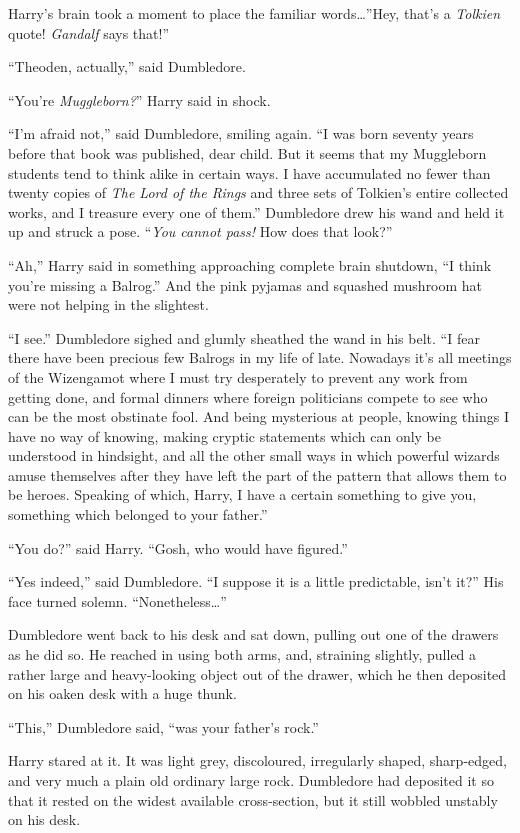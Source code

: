 Harry’s brain took a moment to place the familiar words…”Hey, that’s a \emph{Tolkien} quote! \emph{Gandalf} says that!”

“Theoden, actually,” said Dumbledore.

“You’re \emph{Muggleborn?}” Harry said in shock.

“I’m afraid not,” said Dumbledore, smiling again. “I was born seventy years before that book was published, dear child. But it seems that my Muggleborn students tend to think alike in certain ways. I have accumulated no fewer than twenty copies of \emph{The Lord of the Rings} and three sets of Tolkien’s entire collected works, and I treasure every one of them.” Dumbledore drew his wand and held it up and struck a pose. “\emph{You cannot pass!} How does that look?”

“Ah,” Harry said in something approaching complete brain shutdown, “I think you’re missing a Balrog.” And the pink pyjamas and squashed mushroom hat were not helping in the slightest.

“I see.” Dumbledore sighed and glumly sheathed the wand in his belt. “I fear there have been precious few Balrogs in my life of late. Nowadays it’s all meetings of the Wizengamot where I must try desperately to prevent any work from getting done, and formal dinners where foreign politicians compete to see who can be the most obstinate fool. And being mysterious at people, knowing things I have no way of knowing, making cryptic statements which can only be understood in hindsight, and all the other small ways in which powerful wizards amuse themselves after they have left the part of the pattern that allows them to be heroes. Speaking of which, Harry, I have a certain something to give you, something which belonged to your father.”

“You do?” said Harry. “Gosh, who would have figured.”

“Yes indeed,” said Dumbledore. “I suppose it is a little predictable, isn’t it?” His face turned solemn. “Nonetheless…”

Dumbledore went back to his desk and sat down, pulling out one of the drawers as he did so. He reached in using both arms, and, straining slightly, pulled a rather large and heavy-looking object out of the drawer, which he then deposited on his oaken desk with a huge thunk.

“This,” Dumbledore said, “was your father’s rock.”

Harry stared at it. It was light grey, discoloured, irregularly shaped, sharp-edged, and very much a plain old ordinary large rock. Dumbledore had deposited it so that it rested on the widest available cross-section, but it still wobbled unstably on his desk.

